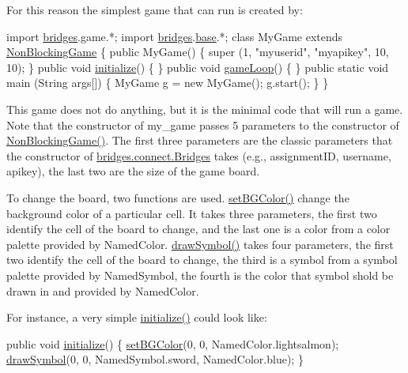 For this reason the simplest game that can run is created by\+:


\begin{DoxyCode}
\textcolor{keyword}{import} \hyperlink{namespacebridges}{bridges}.game.*;
\textcolor{keyword}{import} \hyperlink{namespacebridges}{bridges}.\hyperlink{namespacebridges_1_1base}{base}.*;
\textcolor{keyword}{class }MyGame \textcolor{keyword}{extends} \hyperlink{classbridges_1_1games_1_1_non_blocking_game_a49b9b0ec57b9ab0fe099922bde75ed8a}{NonBlockingGame} \{
  \textcolor{keyword}{public} MyGame() \{ super (1, \textcolor{stringliteral}{"myuserid"},  \textcolor{stringliteral}{"myapikey"}, 10, 10); \}
  \textcolor{keyword}{public} \textcolor{keywordtype}{void} \hyperlink{classbridges_1_1games_1_1_game_base_a973a52d5eee7c29b01d668fba3c61657}{initialize}()  \{ \}
  \textcolor{keyword}{public} \textcolor{keywordtype}{void} \hyperlink{classbridges_1_1games_1_1_game_base_a56d05ed744791cfc1c3792f39ff438f1}{gameLoop}()  \{ \}
  \textcolor{keyword}{public} \textcolor{keyword}{static} \textcolor{keywordtype}{void}  main (String args[]) \{
    MyGame g = \textcolor{keyword}{new} MyGame();
    g.start();
  \}
\}
\end{DoxyCode}


This game does not do anything, but it is the minimal code that will run a game. Note that the constructor of my\+\_\+game passes 5 parameters to the constructor of \hyperlink{classbridges_1_1games_1_1_non_blocking_game_a49b9b0ec57b9ab0fe099922bde75ed8a}{Non\+Blocking\+Game()}. The first three parameters are the classic parameters that the constructor of \hyperlink{classbridges_1_1connect_1_1_bridges}{bridges.\+connect.\+Bridges} takes (e.\+g., assignment\+ID, username, apikey), the last two are the size of the game board.

To change the board, two functions are used. \hyperlink{classbridges_1_1games_1_1_game_base_a7b4d08cdb306a5bf7104ab5315acb414}{set\+B\+G\+Color()} change the background color of a particular cell. It takes three parameters, the first two identify the cell of the board to change, and the last one is a color from a color palette provided by Named\+Color. \hyperlink{classbridges_1_1games_1_1_game_base_a03e8446feb00d5957a7e160a4fa76342}{draw\+Symbol()} takes four parameters, the first two identify the cell of the board to change, the third is a symbol from a symbol palette provided by Named\+Symbol, the fourth is the color that symbol shold be drawn in and provided by Named\+Color.

For instance, a very simple \hyperlink{classbridges_1_1games_1_1_game_base_a973a52d5eee7c29b01d668fba3c61657}{initialize()} could look like\+: 
\begin{DoxyCode}
\textcolor{keyword}{public} \textcolor{keywordtype}{void} \hyperlink{classbridges_1_1games_1_1_game_base_a973a52d5eee7c29b01d668fba3c61657}{initialize}() \{
  \hyperlink{classbridges_1_1games_1_1_game_base_a7b4d08cdb306a5bf7104ab5315acb414}{setBGColor}(0, 0, NamedColor.lightsalmon);
  \hyperlink{classbridges_1_1games_1_1_game_base_a03e8446feb00d5957a7e160a4fa76342}{drawSymbol}(0, 0, NamedSymbol.sword, NamedColor.blue);
\}
\end{DoxyCode}


